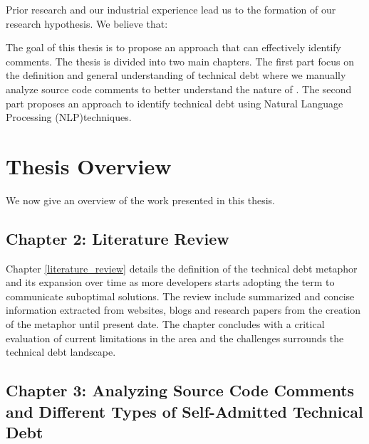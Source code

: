 Prior research and our industrial experience lead us to the formation of our research hypothesis. We believe that:


The goal of this thesis is to propose an approach that can effectively identify \SATD comments. The thesis is divided into two main chapters. The first part focus on the definition and general understanding of technical debt where we manually analyze source code comments to better understand the nature of \SATD. The second part proposes an approach to identify technical debt using Natural Language Processing (NLP)techniques.

\section{Thesis Overview}

We now give an overview of the work presented in this thesis.

\subsection{Chapter 2: Literature Review}

Chapter \ref{literature_review} details the definition of the technical debt metaphor and its expansion over time as more developers starts adopting the term to communicate suboptimal solutions. The review include summarized and concise information extracted from websites, blogs and research papers from the creation of the metaphor until present date. The chapter concludes with a critical evaluation of current limitations in the area and the challenges surrounds the technical debt landscape.

\subsection{Chapter 3: Analyzing Source Code Comments and Different Types of Self-Admitted Technical Debt}
    
